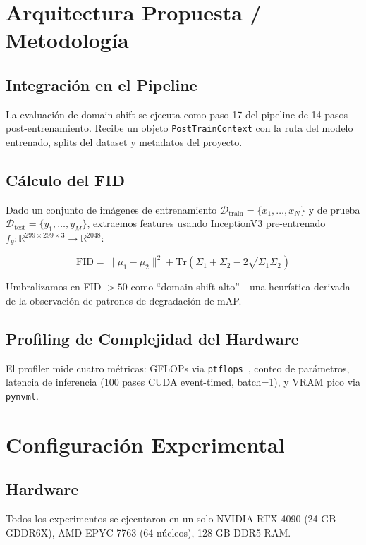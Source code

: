 \documentclass[10pt,twocolumn,letterpaper]{article}
\begin{document}
\section{Arquitectura Propuesta / Metodología}
\subsection{Integración en el Pipeline}
La evaluación de domain shift se ejecuta como paso 17 del pipeline de 14 pasos post-entrenamiento. Recibe un objeto \texttt{PostTrainContext} con la ruta del modelo entrenado, splits del dataset y metadatos del proyecto.

\subsection{Cálculo del FID}
Dado un conjunto de imágenes de entrenamiento $\mathcal{D}_{\text{train}} = \{x_1, \ldots, x_N\}$ y de prueba $\mathcal{D}_{\text{test}} = \{y_1, \ldots, y_M\}$, extraemos features usando InceptionV3 pre-entrenado $f_\theta: \mathbb{R}^{299 \times 299 \times 3} \rightarrow \mathbb{R}^{2048}$:

\begin{equation}
    \text{FID} = \|\mu_1 - \mu_2\|^2 + \text{Tr}\left(\Sigma_1 + \Sigma_2 - 2\sqrt{\Sigma_1 \Sigma_2}\right)
\end{equation}

Umbralizamos en FID $> 50$ como ``domain shift alto''---una heurística derivada de la observación de patrones de degradación de mAP.

\subsection{Profiling de Complejidad del Hardware}
El profiler mide cuatro métricas: GFLOPs via \texttt{ptflops}~\cite{ptflops}, conteo de parámetros, latencia de inferencia (100 pases CUDA event-timed, batch=1), y VRAM pico via \texttt{pynvml}.

\section{Configuración Experimental}
\subsection{Hardware}
Todos los experimentos se ejecutaron en un solo NVIDIA RTX 4090 (24 GB GDDR6X), AMD EPYC 7763 (64 núcleos), 128 GB DDR5 RAM.
\end{document}
